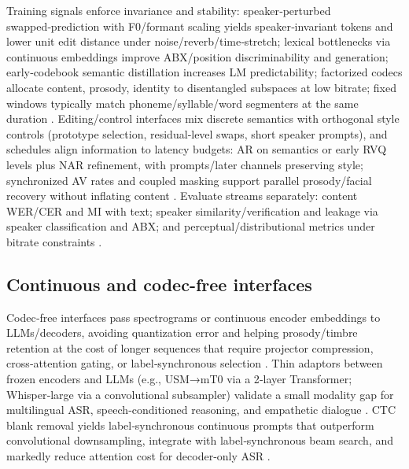 Training signals enforce invariance and stability: speaker‑perturbed swapped‑prediction with F0/formant scaling yields speaker‑invariant tokens and lower unit edit distance under noise/reverb/time‑stretch; lexical bottlenecks via continuous embeddings improve ABX/position discriminability and generation; early‑codebook semantic distillation increases LM predictability; factorized codecs allocate content, prosody, identity to disentangled subspaces at low bitrate; fixed windows typically match phoneme/syllable/word segmenters at the same duration \cite{chang2024dcspinspeakerinvariantspeechtokenizerspo,algayres2023generativespokenlanguagemodelbasedcontin,guo2025recentadvancesdiscretespeechtokensreview,kando2025exploringeffectsegmentationvocabularysiz}. Editing/control interfaces mix discrete semantics with orthogonal style controls (prototype selection, residual‑level swaps, short speaker prompts), and schedules align information to latency budgets: AR on semantics or early RVQ levels plus NAR refinement, with prompts/later channels preserving style; synchronized AV rates and coupled masking support parallel prosody/facial recovery without inflating content \cite{chen2025emovaempoweringlanguagemodelsseehearspea,zhang2024speechtokenizerunifiedspeechtokenizerlar,peng2024mslms2stmultitaskspeechlanguagemodeltext,wang2025bossbeyondsemanticspeech,yang2025diffsoundstreamefficientspeechtokenizati,sadok2025vectorquantizedmaskedautoencoderaudiovis}. Evaluate streams separately: content WER/CER and MI with text; speaker similarity/verification and leakage via speaker classification and ABX; and perceptual/distributional metrics under bitrate constraints \cite{zhang2024speechtokenizerunifiedspeechtokenizerlar,guo2025recentadvancesdiscretespeechtokensreview}.

\subsection{Continuous and codec-free interfaces} \label{subsec:Continuous and codec-free interfaces}
Codec‑free interfaces pass spectrograms or continuous encoder embeddings to LLMs/decoders, avoiding quantization error and helping prosody/timbre retention at the cost of longer sequences that require projector compression, cross‑attention gating, or label‑synchronous selection \cite{guo2025recentadvancesdiscretespeechtokensreview}. Thin adaptors between frozen encoders and LLMs (e.g., USM→mT0 via a 2‑layer Transformer; Whisper‑large via a convolutional subsampler) validate a small modality gap for multilingual ASR, speech‑conditioned reasoning, and empathetic dialogue \cite{wang2023slmbridgethingapbetweenspeechtextfoundat,wang2024blspemotowardsempatheticlargespeechlangu,nguyen2025qwenvsgemmaintegrationwhispercomparative}. CTC blank removal yields label‑synchronous continuous prompts that outperform convolutional downsampling, integrate with label‑synchronous beam search, and markedly reduce attention cost for decoder‑only ASR \cite{tsunoo2024decoderonlyarchitecturespeechrecognition}.

